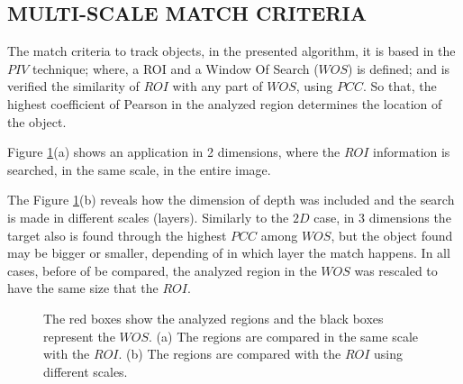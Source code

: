 
\subsection{MULTI-SCALE MATCH CRITERIA}
The match criteria to track objects, in the presented algorithm, 
it is based in the $PIV$ technique; 
where, a ROI and a Window Of Search ($WOS$) is defined; and is 
verified the similarity of $ROI$ with any part of $WOS$, using $PCC$. 
So that, the highest coefficient of Pearson in the analyzed region 
determines the location of the object.

Figure \ref{fig:multires}(a) shows an application in 2 dimensions, where
the $ROI$ information is searched, in the same scale,  in the entire image.

The Figure \ref{fig:multires}(b) reveals how the dimension of depth was included and
the search is made in different scales (layers). Similarly to the $2D$ case, 
in 3 dimensions the target 
also is found through the highest $PCC$ among $WOS$, but the object found may be 
bigger or smaller, depending of in which layer the match happens. 
In all cases, before of be compared, the analyzed region in the $WOS$ was 
rescaled to have the same size that the $ROI$.

\begin{figure}[H]
\centering
  \caption{The red boxes show the analyzed regions and the black boxes represent the $WOS$. 
  (a) The regions are compared in the same scale with the $ROI$. 
  (b) The regions are compared with the $ROI$  using different scales.}
  \label{fig:multires}
\end{figure}




